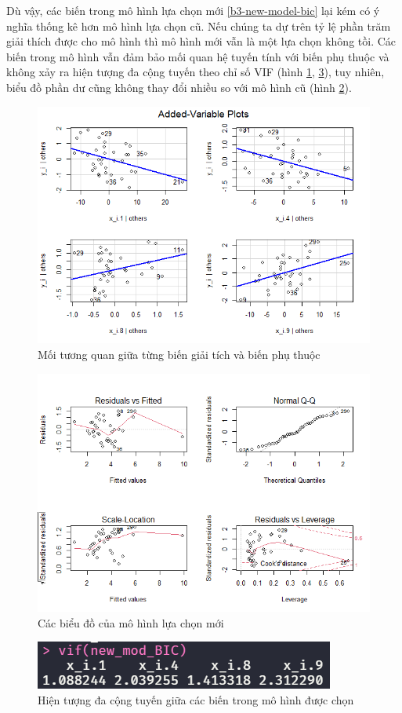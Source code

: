Dù vậy, các biến trong mô hình lựa chọn mới \ref{b3-new-model-bic} lại kém có ý nghĩa thống kê hơn mô hình lựa chọn cũ. Nếu chúng ta dự trên tỷ lệ phần trăm giải thích được cho mô hình thì mô hình mới vẫn là một lựa chọn không tồi. Các biến trong mô hình vẫn đảm bảo mối quan hệ tuyến tính với biến phụ thuộc và không xảy ra hiện tượng đa cộng tuyến theo chỉ số VIF (hình \ref{fig-b3:new-model-bic-vars}, \ref{fig-b3:new-model-bic-vif}), tuy nhiên, biểu đồ phần dư cũng không thay đổi nhiều so với mô hình cũ (hình \ref{fig-b3:new-model-bic-plot}).
\begin{figure}[H]
	\centering
	\includegraphics[width=0.7\linewidth]{images/B3/new-model-bic-vars}
	\caption{Mối tương quan giữa từng biến giải tích và biến phụ thuộc}
	\label{fig-b3:new-model-bic-vars}
\end{figure}

\begin{figure}[H]
	\centering
	\includegraphics[width=0.7\linewidth]{images/B3/new-model-bic-plot}
	\caption{Các biểu đồ của mô hình lựa chọn mới}
	\label{fig-b3:new-model-bic-plot}
\end{figure}

\begin{figure}[H]
	\centering
	\includegraphics[width=0.45\linewidth]{images/B3/new-model-bic-vif}
	\caption{Hiện tượng đa cộng tuyến giữa các biến trong mô hình được chọn}
	\label{fig-b3:new-model-bic-vif}
\end{figure}

